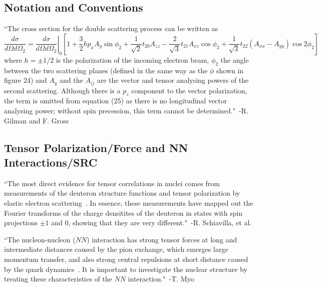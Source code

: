 \subsection{Notation and Conventions}
``The cross section for the double scattering process can be written as~\cite{Arnold:1979cg}
\begin{dmath}
	\frac{d\sigma}{d\Omega d\Omega_2} = \left. \frac{d\sigma}{d\Omega d\Omega_2}\right|_0 \left[1 + \frac{3}{2}hp_xA_y\sin{\phi_2} + \frac{1}{\sqrt{2}}t_{20}A_{zz} - \frac{2}{\sqrt{3}}t_{21}A_{xz}\cos{\phi_2}+\frac{1}{\sqrt{3}}t_{22}\left( A_{xx} - A_{yy} \right) \cos{2\phi_2}  \right]
\end{dmath}
where $h=\pm 1/2$ is the polarization of the incoming electron beam, $\phi_2$ the angle between the two scattering planes (defined in the same way as the $\phi$ shown in figure 24) and $A_y$ and the $A_{ij}$ are the vector and tensor analysing powers of the second scattering. Although there is a $p_z$ component to the vector polarization, the term is omitted from equation (25) as there is no longitudinal vector analysing power; without spin precession, this term cannot be determined."~-R. Gilman and F. Gross~\cite{Gilman:2001yh}

\subsection{Tensor Polarization/Force and NN Interactions/SRC}
``The most direct evidence for tensor correlations in nuclei comes from measurements of the deuteron structure functions and tensor polarization by elastic electron scattering~\cite{Gilman:2001yh}. In essence, these measurements have mapped out the Fourier transforms of the charge densitites of the deuteron in states with spin projections $\pm1$ and 0, showing that they are very different."~-R. Schiavilla, et al.~\cite{Schiavilla:2006xx}

``The nucleon-nucleon ($NN$) interaction has strong tensor forces at long and intermediate distances caused by the pion exchange, which emerges large momentum transfer, and also strong central repulsions at short distance caused by the quark dynamics~\cite{Pieper:2001mp,Kamada:2001tv}. It is important to investigate the nuclear structure by treating these characteristics of the $NN$ interaction."~-T. Myo~\cite{Myo:2013dya}


